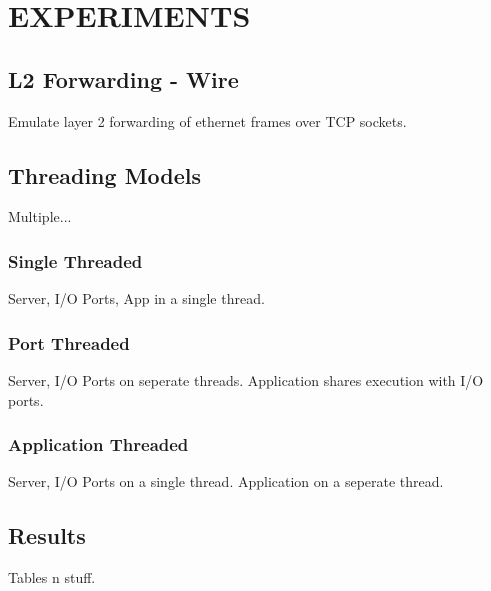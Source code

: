 \chapter{EXPERIMENTS}
\label{expr}

\section{L2 Forwarding - Wire}
\label{expr:wire}
Emulate layer 2 forwarding of ethernet frames over TCP sockets.

\section{Threading Models}
\label{expr:models}
Multiple...

\subsection{Single Threaded}
\label{expr:models-single}
Server, I/O Ports, App in a single thread.

\subsection{Port Threaded}
\label{expr:models-port}
Server, I/O Ports on seperate threads. Application shares execution
with I/O ports.

\subsection{Application Threaded}
\label{expr:models-app}
Server, I/O Ports on a single thread. Application on a seperate thread.

\section{Results}
\label{expr:results}
Tables n stuff.

